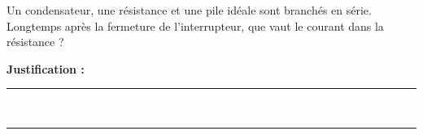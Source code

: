 Un condensateur, une résistance et une pile idéale sont branchés en série. Longtemps après la fermeture de l'interrupteur, que vaut le courant dans la résistance ?

\choices

\noindent\textbf{Justification :} \hrulefill \\[2.5ex]
\rule{\linewidth}{0.4pt} \\[2.5ex]
\rule{\linewidth}{0.4pt}
\vfill
